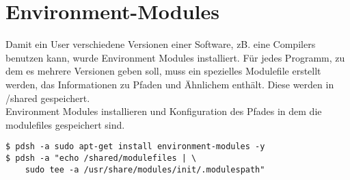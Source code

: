 \chapter{Environment-Modules}
Damit ein User verschiedene Versionen einer Software,
zB. eine Compilers benutzen kann, wurde Environment Modules installiert.
Für jedes Programm, zu dem es mehrere Versionen geben soll,
muss ein spezielles Modulefile erstellt werden,
das Informationen zu Pfaden und Ähnlichem enthält. Diese werden in /shared
gespeichert.
\\
Environment Modules installieren und Konfiguration des Pfades in dem die modulefiles
gespeichert sind.
\begin{lstlisting}[style=Bash]
$ pdsh -a sudo apt-get install environment-modules -y
$ pdsh -a "echo /shared/modulefiles | \
	sudo tee -a /usr/share/modules/init/.modulespath"
\end{lstlisting}
